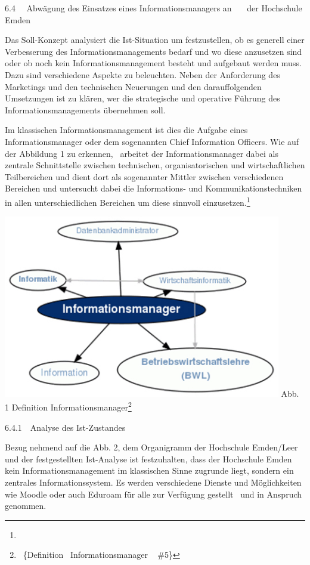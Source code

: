 \documentclass{article}
\title{}
\begin{document}
6.4 \ \ Abwägung des Einsatzes eines Informationsmanagers an \ \ \ der Hochschule Emden


\bigskip

Das Soll-Konzept analysiert die Ist-Situation um festzustellen, ob es generell einer Verbesserung des
Informationsmanagements bedarf und wo diese anzusetzen sind oder ob noch kein Informationsmanagement besteht und
aufgebaut werden muss. Dazu sind verschiedene Aspekte zu beleuchten. Neben der Anforderung des Marketings und den
technischen Neuerungen und den darauffolgenden Umsetzungen ist zu klären, wer die strategische und operative Führung
des Informationsmanagements übernehmen soll. 


\bigskip

Im klassischen Informationsmanagement ist dies die Aufgabe eines Informationsmanager oder dem sogenannten Chief
Information Officers. Wie auf der Abbildung 1 zu erkennen, \ arbeitet der Informationsmanager dabei als zentrale
Schnittstelle zwischen technischen, organisatorischen und wirtschaftlichen Teilbereichen und dient dort als sogenannter
Mittler zwischen verschiedenen Bereichen und untersucht dabei die Informations- und Kommunikationstechniken in allen
unterschiedlichen Bereichen um diese sinnvoll einzusetzen.\footnote{}

 \includegraphics[width=12.139cm,height=7.982cm]{INMGruppe6TeilCIO-img/INMGruppe6TeilCIO-img001.jpg} \newline
Abb. 1 Definition Informationsmanager\footnote{\ \{Definition \ Informationsmanager \ {\textbar} \#5\}\par }

\clearpage
\bigskip

6.4.1\ \ Analyse des Ist-Zustandes

\newline
Bezug nehmend auf die Abb. 2, dem Organigramm der Hochschule Emden/Leer und der festgestellten Ist-Analyse ist
festzuhalten, dass der Hochschule Emden kein Informationsmanagement im klassischen Sinne zugrunde liegt, sondern ein
zentrales Informationssystem. Es werden verschiedene Dienste und Möglichkeiten wie Moodle oder auch Eduroam für alle
zur Verfügung gestellt \ und in Anspruch genommen. 
\end{document}

